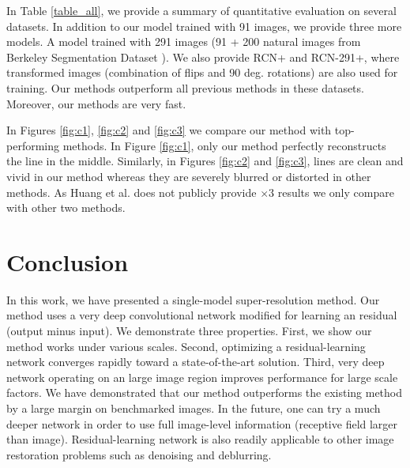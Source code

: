 \documentclass[10pt,twocolumn,letterpaper]{article}
\begin{document}
In Table \ref{table_all}, we provide a summary of quantitative evaluation on several datasets. In addition to our model trained with 91 images, we provide three more models. A model trained with 291 images (91 + 200 natural images from Berkeley Segmentation Dataset \cite{Martin2001}).
We also provide RCN+ and RCN-291+, where transformed images (combination of flips and 90 deg. rotations) are also used for training. Our methods outperform all previous methods in these datasets. Moreover, our methods are very fast.

In Figures \ref{fig:c1}, \ref{fig:c2} and \ref{fig:c3} we compare our method with top-performing methods. In Figure \ref{fig:c1}, only our method perfectly reconstructs the line in the middle. Similarly, in Figures \ref{fig:c2} and \ref{fig:c3}, lines are clean and vivid in our method whereas they are severely blurred or distorted in other methods. As Huang et al. does not publicly provide $\times 3$ results we only compare with other two methods.

\section{Conclusion}
In this work, we have presented a single-model super-resolution method. Our method uses a very deep convolutional network modified for learning an residual (output minus input). We demonstrate three properties. First, we show our method works under various scales. Second, optimizing a residual-learning network converges rapidly toward a state-of-the-art solution. Third, very deep network operating on an large image region improves performance for large scale factors. We have demonstrated that our method outperforms the existing method by a large margin on benchmarked images. In the future, one can try a much deeper network in order to use full image-level information (receptive field larger than image). Residual-learning network is also readily applicable to other image restoration problems such as denoising and deblurring.

{\small
	
	
}
\end{document}

